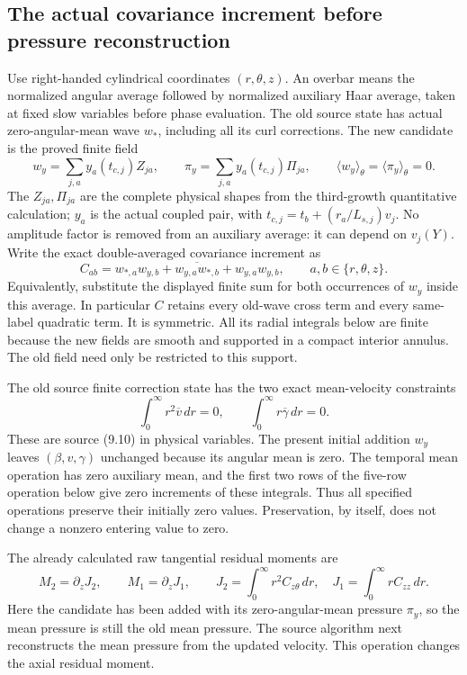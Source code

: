 \subsection{The actual covariance increment before pressure reconstruction}

Use right-handed cylindrical coordinates $(r,\theta,z)$. An overbar
means the normalized angular average followed by normalized auxiliary
Haar average, taken at fixed slow variables before phase evaluation.
The old source state has actual zero-angular-mean wave $w_*$, including
all its curl corrections. The new candidate is the proved finite field
\[
 w_y=\sum_{j,a}y_a(t_{c,j})Z_{ja},\qquad
 \pi_y=\sum_{j,a}y_a(t_{c,j})\Pi_{ja},\qquad
 \langle w_y\rangle_\theta=\langle\pi_y\rangle_\theta=0.
\]
The $Z_{ja},\Pi_{ja}$ are the complete physical shapes from the
third-growth quantitative calculation; $y_a$ is the actual coupled
pair, with $t_{c,j}=t_b+(r_a/L_{s,j})v_j$. No amplitude factor is
removed from an auxiliary average: it can depend on $v_j(Y)$.
Write the exact double-averaged covariance increment as
\begin{equation}\label{momop:C}
 C_{ab}=
 \overline{w_{*,a}w_{y,b}+w_{y,a}w_{*,b}+w_{y,a}w_{y,b}},
 \qquad a,b\in\{r,\theta,z\}.
\end{equation}
Equivalently, substitute the displayed finite sum for both occurrences
of $w_y$ inside this average. In particular $C$ retains every old-wave
cross term and every same-label quadratic term. It is symmetric.
All its radial integrals below are finite because the new fields are
smooth and supported in a compact interior annulus. The old field
need only be restricted to this support.

The old source finite correction state has the two exact mean-velocity
constraints
\[
 \int_0^\infty r^2\overline v\,dr=0,\qquad
 \int_0^\infty r\overline\gamma\,dr=0 .
\]
These are source (9.10) in physical variables. The present initial
addition $w_y$ leaves $(\beta,v,\gamma)$ unchanged because its angular
mean is zero. The temporal mean operation has zero auxiliary mean,
and the first two rows of the five-row operation below give zero
increments of these integrals. Thus all specified operations preserve
their initially zero values. Preservation, by itself, does not change
a nonzero entering value to zero.

The already calculated raw tangential residual moments are
\[
 M_2=\partial_zJ_2,\qquad M_1=\partial_zJ_1,\qquad
 J_2=\int_0^\infty r^2C_{z\theta}\,dr,\quad
 J_1=\int_0^\infty rC_{zz}\,dr.
\]
Here the candidate has been added with its zero-angular-mean pressure
$\pi_y$, so the mean pressure is still the old mean pressure.
The source algorithm next reconstructs the mean pressure from the
updated velocity. This operation changes the axial residual moment.

